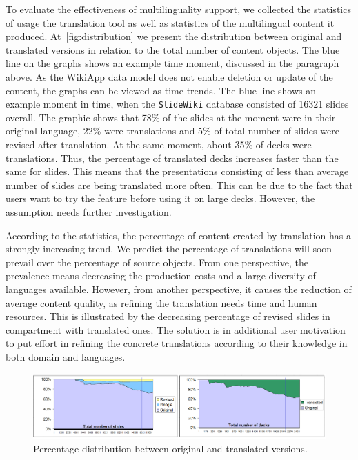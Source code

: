 \documentclass[PhD, Submit, ngerman,UKenglish,table]{scrbook}
\begin{document}
To evaluate the effectiveness of multilinguality support, we collected the statistics of usage the translation tool as well as statistics of the multilingual content it produced.
At~\autoref{fig:distribution} we present the distribution between original and translated versions in relation to the total number of content objects.
The blue line on the graphs shows an example time moment, discussed in the paragraph above.
As the WikiApp data model does not enable deletion or update of the content, the graphs can be viewed as time trends. 
The blue line shows an example moment in time, when the \texttt{SlideWiki} database consisted of 16321 slides overall. 
The graphic shows that 78\% of the slides at the moment were in their original language,  22\% were translations and 5\% of total number of slides were revised after translation.
At the same moment, about 35\% of decks were translations.
Thus, the percentage of translated decks increases faster than the same for slides.
This means that the presentations consisting of less than average number of slides are being translated more often.
This can be due to the fact that users want to try the feature before using it on large decks.
However, the assumption needs further investigation.

According to the statistics, the percentage of content created by translation has a strongly increasing trend.
We predict the percentage of translations will soon prevail over the percentage of source objects. 
From one perspective, the prevalence means decreasing the production costs and a large diversity of languages available.
However, from another perspective, it causes the reduction of average content quality, as refining the translation needs time and human resources.
This is illustrated by the decreasing percentage of revised slides in compartment with translated ones. 
The solution is in additional user motivation to put effort in refining the concrete translations according to their knowledge in both domain and languages. 

\begin{figure}[!ht]
\centering
\includegraphics[width=1\textwidth]{Images/translations_number.png}
\caption{Percentage distribution between original and translated versions.}
\label{fig:distribution}
\end{figure}
\end{document}
